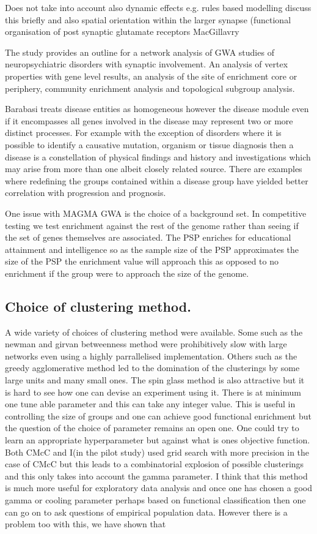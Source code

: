 Does not take into account also dynamic effects e.g. rules based modelling discuss this briefly and also spatial orientation within the larger synapse (functional organisation of post synaptic glutamate receptors MacGillavry

The study provides an outline for a network analysis of GWA studies of neuropsychiatric disorders with synaptic involvement. An analysis of vertex properties with gene level results, an analysis of the site of enrichment core or periphery, community enrichment analysis and topological subgroup analysis. 

Barabasi treats disease entities as homogeneous however the disease module even if it encompasses all genes involved in the disease may represent two or more distinct processes. For example with the exception of disorders where it is possible to identify a causative mutation, organism or tissue diagnosis then a disease is a constellation of physical findings and history and investigations which may arise from more than one albeit closely related source. There are examples where redefining the groups contained within a disease group have yielded better correlation with progression and prognosis. 

One issue with MAGMA GWA is the choice of a background set. In competitive testing we test enrichment against the rest of the genome rather than seeing if the set of genes themselves are associated. The PSP enriches for educational attainment and intelligence so as the sample size of the PSP approximates the size of the PSP the enrichment value will approach this as opposed to no enrichment if the group were to approach the size of the genome. 


\subsection{Choice of clustering method.} 

A wide variety of choices of clustering method were available. Some such as the newman and girvan betweenness method were prohibitively slow with large networks even using a highly parrallelised implementation. Others such as the greedy agglomerative method led to the domination of the clusterings by some large units and many small ones. The spin glass method is also attractive but it is hard to see how one can devise an experiment using it. There is at minimum one tune able parameter and this can take any integer value. This is useful in controlling the size of groups and one can achieve good functional enrichment but the question of the choice of parameter remains an open one. One could try to learn an appropriate hyperparameter but against what is ones objective function. Both CMcC and I(in the pilot study) used grid search with more precision in the case of CMcC but this leads to a combinatorial explosion of possible clusterings and this only takes into account the gamma parameter. I think that this method is much more useful for exploratory data analysis and once one has chosen a good gamma or cooling parameter perhaps based on functional classification then one can go on to ask questions of empirical population data. However there is a problem too with this, we have shown that

